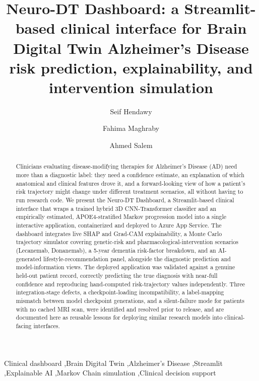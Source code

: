 \documentclass[5p,times,twocolumn]{elsarticle}
\begin{document}
\begin{frontmatter}

\title{Neuro-DT Dashboard: a Streamlit-based clinical interface for Brain Digital Twin Alzheimer's Disease risk prediction, explainability, and intervention simulation}

\author[aastmt]{Seif Hendawy}

\author[aastmt]{Fahima Maghraby}

\author[aastmt]{Ahmed Salem}

\address[aastmt]{Computer Science, Arab Academy for Science, Technology and Maritime Transport (AASTMT), Sheraton, Cairo, Egypt}

\begin{abstract}
Clinicians evaluating disease-modifying therapies for Alzheimer's Disease (AD) need more than a diagnostic label: they need a confidence estimate, an explanation of which anatomical and clinical features drove it, and a forward-looking view of how a patient's risk trajectory might change under different treatment scenarios, all without having to run research code. We present the Neuro-DT Dashboard, a Streamlit-based clinical interface that wraps a trained hybrid 3D CNN-Transformer classifier and an empirically estimated, APOE4-stratified Markov progression model into a single interactive application, containerized and deployed to Azure App Service. The dashboard integrates live SHAP and Grad-CAM explainability, a Monte Carlo trajectory simulator covering genetic-risk and pharmacological-intervention scenarios (Lecanemab, Donanemab), a 5-year dementia risk-factor breakdown, and an AI-generated lifestyle-recommendation panel, alongside the diagnostic prediction and model-information views. The deployed application was validated against a genuine held-out patient record, correctly predicting the true diagnosis with near-full confidence and reproducing hand-computed risk-trajectory values independently. Three integration-stage defects, a checkpoint-loading incompatibility, a label-mapping mismatch between model checkpoint generations, and a silent-failure mode for patients with no cached MRI scan, were identified and resolved prior to release, and are documented here as reusable lessons for deploying similar research models into clinical-facing interfaces.
\end{abstract}

\begin{keyword}
Clinical dashboard \sep Brain Digital Twin \sep Alzheimer's Disease \sep Streamlit \sep Explainable AI \sep Markov Chain simulation \sep Clinical decision support
\end{keyword}

\end{frontmatter}
\end{document}

